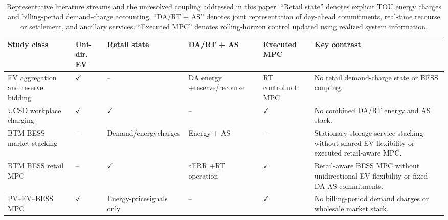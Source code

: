 \documentclass[final,5p,times]{elsarticle}
\begin{document}
\begin{table}[!t]\label{tab:literature_gap}
\centering
\caption{Representative literature streams and the unresolved coupling addressed in this paper.
``Retail state'' denotes explicit TOU energy charges and billing-period demand-charge accounting.
``DA/RT + AS'' denotes joint representation of day-ahead commitments, real-time recourse or settlement, and ancillary services.
``Executed MPC'' denotes rolling-horizon control updated using realized system information.}
\label{tab}
\scriptsize
\setlength{\tabcolsep}{3.0pt}

\begin{tabularx}{\textwidth}{
@{}
>{\raggedright\arraybackslash}p{}
>{\centering\arraybackslash}p{}
>{\centering\arraybackslash}p{}
>{\centering\arraybackslash}p{}
>{\centering\arraybackslash}p{}
>{\raggedright\arraybackslash}X
@{}}
\toprule

Study class
& Uni-dir. EV
& Retail state
& DA/RT + AS
& Executed MPC
& Key contrast \\

\midrule

EV aggregation and reserve bidding
\cite{vagropoulos2013optimal,bessa2014optimization}
&
$\checkmark$
&
--
&
DA energy +\newline reserve/recourse
&
RT control,\newline not MPC
&
No retail demand-charge state or BESS coupling. \\

UCSD workplace charging
\cite{chen2024costoptimal,chen2026realtime}
&
$\checkmark$
&
$\checkmark$
&
--
&
$\checkmark$
&
No combined DA/RT energy and AS stack. \\

BTM BESS market stacking
\cite{hanif2022multiservice,seward2022revenueStacking}
&
--
&
Demand/energy\newline charges
&
Energy + AS
&
--
&
Stationary-storage service stacking without shared EV flexibility or executed retail-aware MPC. \\

BTM BESS retail MPC
\cite{idomar2026stacked}
&
--
&
$\checkmark$
&
aFRR +\newline RT operation
&
$\checkmark$
&
Retail-aware BESS MPC without unidirectional EV flexibility or fixed DA AS commitments. \\

PV--EV--BESS MPC
\cite{cabrera2022realtime,cabrera2024robust}
&
$\checkmark$
&
Energy-price\newline signals only
&
--
&
$\checkmark$
&
No billing-period demand charges or wholesale market stack. \\


\end{tabularx}
\end{table}
\end{document}
